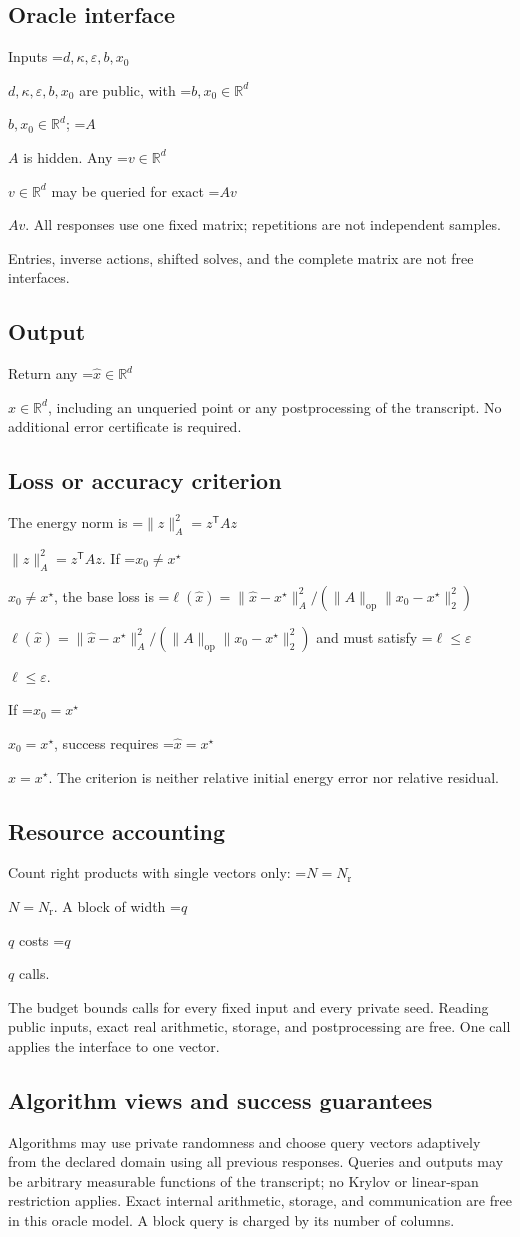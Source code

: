 \documentclass[10pt,a4paper]{article}
\newcommand{\AtlasMath}[1]{\par\begingroup\centering\setbox0=\hbox{$\displaystyle #1$}\ifdim\wd0>1.4\linewidth\typeout{ATLAS WIDE FORMULA: \the\wd0}\fi\ifdim\wd0>\linewidth\resizebox{\linewidth}{!}{\box0}\else\box0\fi\par\endgroup}
\newcommand{\AtlasInlineMath}[1]{\begingroup\setbox0=\hbox{$#1$}\ifdim\wd0>.4\linewidth\endgroup\AtlasMath{#1}\else\endgroup$#1$\fi}
\begin{document}
\subsection{Oracle interface}
Inputs \AtlasInlineMath{d,\kappa,\varepsilon,b,x_0} are public, with \AtlasInlineMath{b,x_0\in\mathbb{R}^d}; \AtlasInlineMath{A} is hidden. Any \AtlasInlineMath{v\in\mathbb{R}^d} may be queried for exact \AtlasInlineMath{Av}. All responses use one fixed matrix; repetitions are not independent samples.

Entries, inverse actions, shifted solves, and the complete matrix are not free interfaces.

\subsection{Output}
Return any \AtlasInlineMath{\widehat x\in\mathbb R^d}, including an unqueried point or any postprocessing of the transcript. No additional error certificate is required.

\subsection{Loss or accuracy criterion}
The energy norm is \AtlasInlineMath{\|z\|_A^2=z^{\mathsf T}Az}. If \AtlasInlineMath{x_0\ne x^\star}, the base loss is \AtlasInlineMath{\ell(\widehat{x})=\|\widehat{x}-x^\star\|_A^2/(\|A\|_{\mathrm{op}}\|x_0-x^\star\|_2^2)} and must satisfy \AtlasInlineMath{\ell\le\varepsilon}.

If \AtlasInlineMath{x_0=x^\star}, success requires \AtlasInlineMath{\widehat x=x^\star}. The criterion is neither relative initial energy error nor relative residual.

\subsection{Resource accounting}
Count right products with single vectors only: \AtlasInlineMath{N=N_{\mathrm r}}. A block of width \AtlasInlineMath{q} costs \AtlasInlineMath{q} calls.

The budget bounds calls for every fixed input and every private seed. Reading public inputs, exact real arithmetic, storage, and postprocessing are free. One call applies the interface to one vector.

\subsection{Algorithm views and success guarantees}
Algorithms may use private randomness and choose query vectors adaptively from the declared domain using all previous responses. Queries and outputs may be arbitrary measurable functions of the transcript; no Krylov or linear-span restriction applies. Exact internal arithmetic, storage, and communication are free in this oracle model. A block query is charged by its number of columns.
\end{document}
